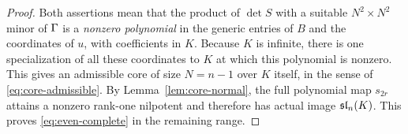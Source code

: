 \begin{proof}
\enlargethispage{1\baselineskip}
Both assertions mean that the product of $\det S$ with a
suitable $N^2\times N^2$ minor of $\Gamma$ is a \emph{nonzero
polynomial} in the generic entries of $B$ and the coordinates
of $u$, with coefficients in $K$. Because $K$ is infinite,
there is one specialization of all these coordinates to $K$
at which this polynomial is nonzero. This gives an admissible
core of size $N=n-1$ over $K$ itself, in the sense of
\eqref{eq:core-admissible}. By Lemma~\ref{lem:core-normal},
the full polynomial map $s_{2r}$ attains a nonzero rank-one
nilpotent and therefore has actual image $\mathfrak{sl}_n(K)$.
This proves \eqref{eq:even-complete} in the remaining range.
\end{proof}

